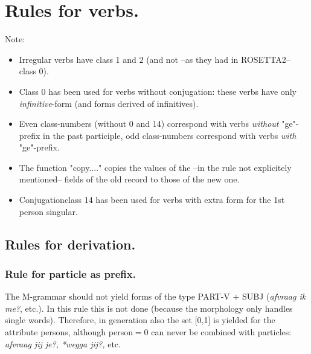 
   \RosDate{\today}
   \RosSupersedes{-}
   \MakeRosTitle


\section{Rules for verbs.}

Note:
\begin{itemize}
 \item Irregular verbs have class 1 and 2 (and not --as they had in ROSETTA2-- 
       class 0).
 \item Class 0 has been used for verbs without conjugation: these verbs have 
       only {\em infinitive}-form (and forms derived of infinitives).
 \item Even class-numbers (without 0 and 14) correspond with verbs {\em without}
       "ge"-prefix in the past participle, odd class-numbers 
       correspond with verbs {\em with} "ge"-prefix.
 \item The function "copy...." copies the values of the --in the rule not 
       explicitely mentioned-- fields of the old record to those of the new one.
 \item Conjugationclass 14 has been used for verbs with extra form for the
       1st person singular.
\end{itemize}

\subsection{Rules for derivation.}
\subsubsection{Rule for particle as prefix.}

The M-grammar should not yield forms of the type PART-V $ + $ SUBJ 
({\em *afvraag ik me?}, etc.). 
In this rule this is not done (because the morphology only handles
single words). Therefore, in generation also the set [0,1] is yielded for the
attribute persons, although person$=$0 can never be combined with particles:
{\em *afvraag jij je?, *wegga jij?,} etc.

